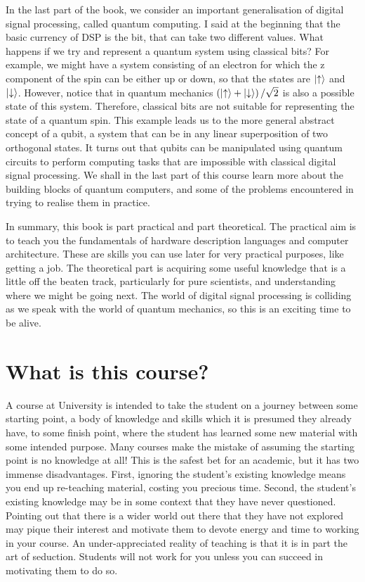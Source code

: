 \documentclass[../physical_computing.tex]{subfiles}
\begin{document}
In the last part of the book, we consider an important generalisation of digital signal processing, called quantum computing. I said at the beginning that the basic currency of DSP is the bit, that can take two different values. What happens if we try and represent a quantum system using classical bits? For example, we might have a system consisting of an electron for which the z component of the spin can be either up or down, so that the states are $\Ket{\uparrow}$ and $\Ket{\downarrow}$. However, notice that in quantum mechanics $\left(\Ket{\uparrow}+\Ket{\downarrow}\right)/\sqrt{2}$ is also a possible state of this system. Therefore, classical bits are not suitable for representing the state of a quantum spin. This example leads us to the more general abstract concept of a qubit, a system that can be in any linear superposition of two orthogonal states. It turns out that qubits can be manipulated using quantum circuits to perform computing tasks that are impossible with classical digital signal processing. We shall in the last part of this course learn more about the building blocks of quantum computers, and some of the problems encountered in trying to realise them in practice.

In summary, this book is part practical and part theoretical. The practical aim is to teach you the fundamentals of hardware description languages and computer architecture. These are skills you can use later for very practical purposes, like getting a job. The theoretical part is acquiring some useful knowledge that is a little off the beaten track, particularly for pure scientists, and understanding where we might be going next. The world of digital signal processing is colliding as we speak with the world of quantum mechanics, so this is an exciting time to be alive.

\section{What is this course?}
\label{sec:whatisit}

A course at University is intended to take the student on a journey between some starting point, a body of knowledge and skills which it is presumed they already have, to some finish point, where the student has learned some new material with some intended purpose. Many courses make the mistake of assuming the starting point is no knowledge at all! This is the safest bet for an academic, but it has two immense disadvantages. First, ignoring the student's existing knowledge means you end up re-teaching material, costing you precious time. Second, the student's existing knowledge may be in some context that they have never questioned. Pointing out that there is a wider world out there that they have not explored may pique their interest and motivate them to devote energy and time to working in your course. An under-appreciated reality of teaching is that it is in part the art of seduction. Students will not work for you unless you can succeed in motivating them to do so.
\end{document}
